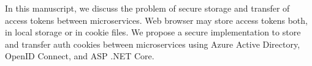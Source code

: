 In this manuscript, we discuss the problem of secure storage and transfer of access tokens between microservices.
Web browser may store access tokens both, in local storage or in cookie files.
We propose a secure implementation to store and transfer auth cookies between microservices
using Azure Active Directory, OpenID Connect, and ASP .NET Core.